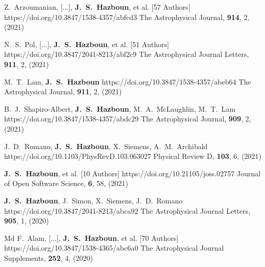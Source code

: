          {Z.~{Arzoumanian}, [...], \textbf{J.~S.~{Hazboun}}, et al. [57 Authors]}
         {https://doi.org/10.3847/1538-4357/abfcd3}
         {{The Astrophysical Journal}, \textbf{914}, 2, (2021)}

         {N.~S.~{Pol}, [...], \textbf{J.~S.~{Hazboun}}, et al. [51 Authors]}
         {https://doi.org/10.3847/2041-8213/abf2c9}
         {{The Astrophysical Journal Letters}, \textbf{911}, 2, (2021)}

         {M.~T.~{Lam}, \textbf{J.~S.~Hazboun}}
         {https://doi.org/10.3847/1538-4357/abeb64}
         {{The Astrophysical Journal}, \textbf{911}, 2, (2021)}

         {B.~J.~Shapiro-Albert, \textbf{J.~S.~Hazboun}, M.~A.~{McLaughlin}, M.~T.~{Lam}}
         {https://doi.org/10.3847/1538-4357/abdc29}
         {{The Astrophysical Journal}, \textbf{909}, 2, (2021)}

         {J.~D.~{Romano}, \textbf{J.~S.~Hazboun}, X.~{Siemens}, A.~M.~{Archibald}}
         {https://doi.org/10.1103/PhysRevD.103.063027}
         {{Physical Review D}, \textbf{103}, 6, (2021)}

         {\textbf{J.~S.~{Hazboun}}, et al. [10 Authors]}
         {https://doi.org/10.21105/joss.02757}
         {{Journal of Open Software Science}, \textbf{6}, 58, (2021)}

         {\textbf{J.~S.~Hazboun}, J.~{Simon}, X.~{Siemens}, J.~D.~{Romano}}
         {https://doi.org/10.3847/2041-8213/abca92}
         {{The Astrophysical Journal Letters}, \textbf{905}, 1, (2020)}

         {Md F.~{Alam}, [...], \textbf{J.~S.~{Hazboun}}, et al. [70 Authors]}
         {https://doi.org/10.3847/1538-4365/abc6a0}
         {{The Astrophysical Journal Supplements}, \textbf{252}, 4, (2020)}

